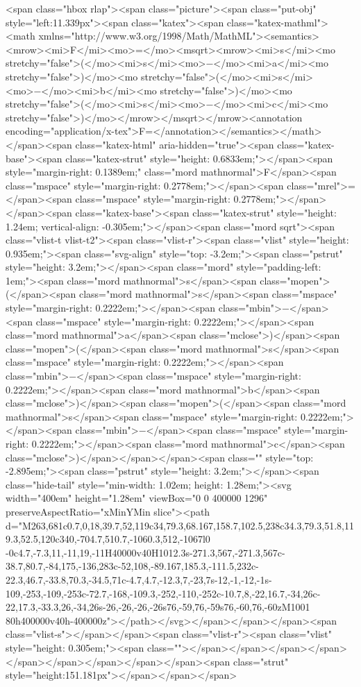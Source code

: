 <span class="hbox rlap"><span class="picture"><span class="put-obj" style="left:11.339px"><span class="katex"><span class="katex-mathml"><math xmlns="http://www.w3.org/1998/Math/MathML"><semantics><mrow><mi>F</mi><mo>=</mo><msqrt><mrow><mi>s</mi><mo stretchy="false">(</mo><mi>s</mi><mo>−</mo><mi>a</mi><mo stretchy="false">)</mo><mo stretchy="false">(</mo><mi>s</mi><mo>−</mo><mi>b</mi><mo stretchy="false">)</mo><mo stretchy="false">(</mo><mi>s</mi><mo>−</mo><mi>c</mi><mo stretchy="false">)</mo></mrow></msqrt></mrow><annotation encoding="application/x-tex">F=</annotation></semantics></math></span><span class="katex-html" aria-hidden="true"><span class="katex-base"><span class="katex-strut" style="height: 0.6833em;"></span><span style="margin-right: 0.1389em;" class="mord mathnormal">F</span><span class="mspace" style="margin-right: 0.2778em;"></span><span class="mrel">=</span><span class="mspace" style="margin-right: 0.2778em;"></span></span><span class="katex-base"><span class="katex-strut" style="height: 1.24em; vertical-align: -0.305em;"></span><span class="mord sqrt"><span class="vlist-t vlist-t2"><span class="vlist-r"><span class="vlist" style="height: 0.935em;"><span class="svg-align" style="top: -3.2em;"><span class="pstrut" style="height: 3.2em;"></span><span class="mord" style="padding-left: 1em;"><span class="mord mathnormal">s</span><span class="mopen">(</span><span class="mord mathnormal">s</span><span class="mspace" style="margin-right: 0.2222em;"></span><span class="mbin">−</span><span class="mspace" style="margin-right: 0.2222em;"></span><span class="mord mathnormal">a</span><span class="mclose">)</span><span class="mopen">(</span><span class="mord mathnormal">s</span><span class="mspace" style="margin-right: 0.2222em;"></span><span class="mbin">−</span><span class="mspace" style="margin-right: 0.2222em;"></span><span class="mord mathnormal">b</span><span class="mclose">)</span><span class="mopen">(</span><span class="mord mathnormal">s</span><span class="mspace" style="margin-right: 0.2222em;"></span><span class="mbin">−</span><span class="mspace" style="margin-right: 0.2222em;"></span><span class="mord mathnormal">c</span><span class="mclose">)</span></span></span><span class="" style="top: -2.895em;"><span class="pstrut" style="height: 3.2em;"></span><span class="hide-tail" style="min-width: 1.02em; height: 1.28em;"><svg width="400em" height="1.28em" viewBox="0 0 400000 1296" preserveAspectRatio="xMinYMin slice"><path d="M263,681c0.7,0,18,39.7,52,119c34,79.3,68.167,158.7,102.5,238c34.3,79.3,51.8,119.3,52.5,120c340,-704.7,510.7,-1060.3,512,-1067l0 -0c4.7,-7.3,11,-11,19,-11H40000v40H1012.3s-271.3,567,-271.3,567c-38.7,80.7,-84,175,-136,283c-52,108,-89.167,185.3,-111.5,232c-22.3,46.7,-33.8,70.3,-34.5,71c-4.7,4.7,-12.3,7,-23,7s-12,-1,-12,-1s-109,-253,-109,-253c-72.7,-168,-109.3,-252,-110,-252c-10.7,8,-22,16.7,-34,26c-22,17.3,-33.3,26,-34,26s-26,-26,-26,-26s76,-59,76,-59s76,-60,76,-60zM1001 80h400000v40h-400000z"></path></svg></span></span></span><span class="vlist-s">​</span></span><span class="vlist-r"><span class="vlist" style="height: 0.305em;"><span class=""></span></span></span></span></span></span></span></span></span><span class="strut" style="height:151.181px"></span></span></span>
